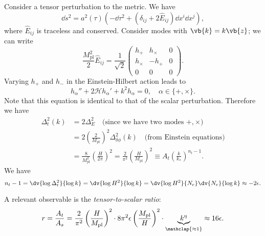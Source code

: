 \documentclass{jknotes}
\begin{document}
Consider a tensor perturbation to the metric. We have
\begin{equation}
    \dd{s}^2 = a^2(\tau)\left(-\dd{\tau}^2 + \left(\delta_{ij}+2\hat{E}_{ij}\right)\dd{x^i}\dd{x^j}\right),
\end{equation}
where \(\hat{E}_{ij}\) is traceless and conserved. Consider modes with \(\vb{k} = k\vb{z}\); we can write
\begin{equation}
    \frac{M_{\text{pl}}^2}{2}\hat{E}_{ij} = \frac1{\sqrt{2}}
    \begin{pmatrix}
        h_+ & h_\times & 0 \\
        h_\times & -h_+ & 0 \\
        0 & 0 & 0
    \end{pmatrix}.
\end{equation}
Varying \(h_+\) and \(h_-\) in the Einstein-Hilbert action leads to 
\begin{equation}
    h_\alpha'' + 2\mathcal{H}h_\alpha' + k^2h_\alpha = 0,\quad \alpha \in \{+,\times\}.
\end{equation}
Note that this equation is identical to that of the scalar perturbation. Therefore we have
\begin{align}
    \Delta^2_t(k) &= 2 \Delta^2_E \quad \text{(since we have two modes \(+,\times\))}\\
                  &= 2 \left(\frac2{M_{\text{pl}}}\right)^2\Delta^2_{\delta\phi}(k) \quad \text{(from Einstein equations)} \\
                  &= \frac8{M_{\text{pl}}^2}\left(\frac{H}{2\pi}\right)^2 
                  = \frac2{\pi^2}\left(\frac{H}{M_{\text{pl}}}\right)^2 
                  \equiv A_t \left(\frac{k}{k_*}\right)^{n_t-1}.
\end{align}
We have
\begin{equation}
    n_t - 1 = \dv{\log\Delta_t^2}{\log k} = \dv{\log H^2}{\log k} = \dv{\log H^2}{N_e}\dv{N_e}{\log k} \approx - 2\epsilon.
\end{equation}

A relevant observable is the \emph{tensor-to-scalar ratio}:
\begin{equation}
    r = \frac{A_t}{A_s} = \frac2{\pi^2}\left(\frac{H}{M_{\text{pl}}}\right)^2\cdot8\pi^2\epsilon\left(\frac{M_{\text{pl}}}{H}\right)^2 \cdot \underbrace{k^\eta}_{\mathclap{\approx1}} \approx 16\epsilon.
\end{equation}
\end{document}
